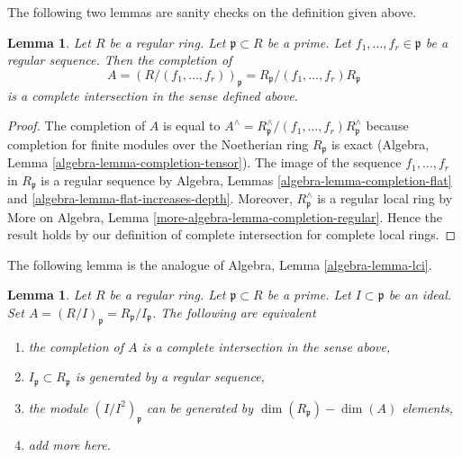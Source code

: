 \documentclass{stacks-project}
\theoremstyle{plain}
\newtheorem{lemma}[subsection]{Lemma}
\theoremstyle{definition}
\theoremstyle{remark}
\numberwithin{equation}{subsection}
\begin{document}
\noindent
The following two lemmas are sanity checks on the definition given above.

\begin{lemma}
\label{lemma-quotient-regular-ring-by-regular-sequence}
Let $R$ be a regular ring. Let $\mathfrak p \subset R$ be a prime.
Let $f_1, \ldots, f_r \in \mathfrak p$ be a regular sequence.
Then the completion of
$$
A = (R/(f_1, \ldots, f_r))_\mathfrak p =
R_\mathfrak p/(f_1, \ldots, f_r)R_\mathfrak p
$$
is a complete intersection in the sense defined above.
\end{lemma}

\begin{proof}
The completion of $A$ is equal to
$A^\wedge = R_\mathfrak p^\wedge/(f_1, \ldots, f_r)R_\mathfrak p^\wedge$
because completion for finite modules over the Noetherian ring
$R_\mathfrak p$ is exact
(Algebra, Lemma \ref{algebra-lemma-completion-tensor}).
The image of the sequence $f_1, \ldots, f_r$ in $R_\mathfrak p$
is a regular sequence by
Algebra, Lemmas \ref{algebra-lemma-completion-flat} and
\ref{algebra-lemma-flat-increases-depth}.
Moreover, $R_\mathfrak p^\wedge$ is a regular local ring by
More on Algebra, Lemma \ref{more-algebra-lemma-completion-regular}.
Hence the result holds by our definition of complete
intersection for complete local rings.
\end{proof}

\noindent
The following lemma is the analogue of Algebra, Lemma \ref{algebra-lemma-lci}.

\begin{lemma}
\label{lemma-quotient-regular-ring}
Let $R$ be a regular ring. Let $\mathfrak p \subset R$ be a prime.
Let $I \subset \mathfrak p$ be an ideal.
Set $A = (R/I)_\mathfrak p = R_\mathfrak p/I_\mathfrak p$.
The following are equivalent
\begin{enumerate}
\item the completion of $A$
is a complete intersection in the sense above,
\item $I_\mathfrak p \subset R_\mathfrak p$ is generated
by a regular sequence,
\item the module $(I/I^2)_\mathfrak p$ can be generated by
$\dim(R_\mathfrak p) - \dim(A)$ elements,
\item add more here.
\end{enumerate}
\end{lemma}
\end{document}
